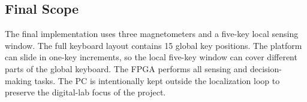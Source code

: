 \subsection{Final Scope}

The final implementation uses three magnetometers and a five-key local sensing window. The full keyboard layout contains 15 global key positions. The platform can slide in one-key increments, so the local five-key window can cover different parts of the global keyboard. The FPGA performs all sensing and decision-making tasks. The PC is intentionally kept outside the localization loop to preserve the digital-lab focus of the project.

